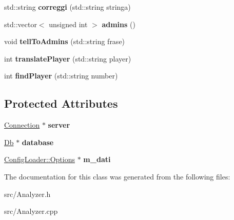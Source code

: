 \begin{DoxyCompactItemize}
\item 
\hypertarget{class_analyzer_a2b7a395ae144853d95f95c5001131dea}{
std::string {\bfseries correggi} (std::string stringa)}
\label{class_analyzer_a2b7a395ae144853d95f95c5001131dea}

\item 
\hypertarget{class_analyzer_a8d006abe3ec7375d5e1e33bd572e145b}{
std::vector$<$ unsigned int $>$ {\bfseries admins} ()}
\label{class_analyzer_a8d006abe3ec7375d5e1e33bd572e145b}

\item 
\hypertarget{class_analyzer_a17407085ffd02adb5a1f43d19034d3ba}{
void {\bfseries tellToAdmins} (std::string frase)}
\label{class_analyzer_a17407085ffd02adb5a1f43d19034d3ba}

\item 
\hypertarget{class_analyzer_a89cdd7ecf5fde88e02d8ec6e27018764}{
int {\bfseries translatePlayer} (std::string player)}
\label{class_analyzer_a89cdd7ecf5fde88e02d8ec6e27018764}

\item 
\hypertarget{class_analyzer_a640f693c875dbd4f2e67add66bf5cf1e}{
int {\bfseries findPlayer} (std::string number)}
\label{class_analyzer_a640f693c875dbd4f2e67add66bf5cf1e}

\end{DoxyCompactItemize}
\subsection*{Protected Attributes}
\begin{DoxyCompactItemize}
\item 
\hypertarget{class_analyzer_ad3471cda947803628d9f491cb202df08}{
\hyperlink{class_connection}{Connection} $\ast$ {\bfseries server}}
\label{class_analyzer_ad3471cda947803628d9f491cb202df08}

\item 
\hypertarget{class_analyzer_aa97e8083e22d869a31098a17b22fc632}{
\hyperlink{class_db}{Db} $\ast$ {\bfseries database}}
\label{class_analyzer_aa97e8083e22d869a31098a17b22fc632}

\item 
\hypertarget{class_analyzer_a158bbcde6eca393f36ab459bbe152e15}{
\hyperlink{class_config_loader_1_1_options}{ConfigLoader::Options} $\ast$ {\bfseries m\_\-dati}}
\label{class_analyzer_a158bbcde6eca393f36ab459bbe152e15}

\end{DoxyCompactItemize}


The documentation for this class was generated from the following files:\begin{DoxyCompactItemize}
\item 
src/Analyzer.h\item 
src/Analyzer.cpp\end{DoxyCompactItemize}
